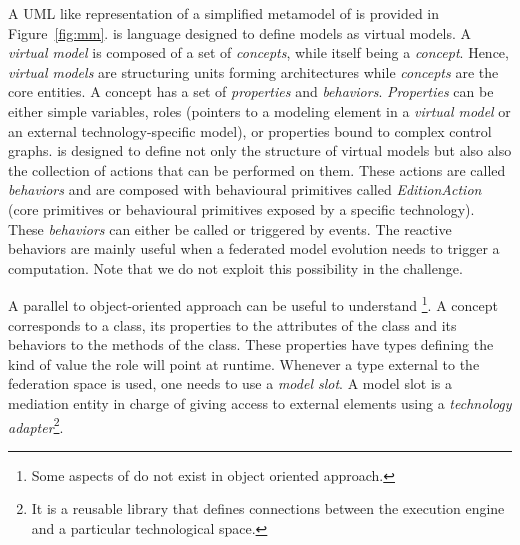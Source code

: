 A UML like representation of a simplified metamodel of \FML is provided in Figure~\ref{fig:mm}. \FML is language designed to define models as virtual models. A \emph{virtual model} is composed of a set of \emph{concepts}, while itself being a \emph{concept}. Hence, \emph{virtual models} are structuring units forming architectures while \emph{concepts} are the core entities. A concept has a set of \emph{properties} and \emph{behaviors}. \emph{Properties} can be either simple variables, roles (pointers to a modeling element in a \emph{virtual model} or an external technology-specific model), or properties bound to complex control graphs. \FML is designed to define not only the structure of virtual models but also also the collection of actions that can be performed on them. These actions are called \emph{behaviors} and are composed with behavioural primitives called \emph{EditionAction} (core \FML primitives or behavioural primitives exposed by a specific technology). These \emph{behaviors} can either be called or triggered by events. The reactive behaviors are mainly useful when a federated model evolution needs to trigger a computation. Note that we do not exploit this possibility in the challenge.

A parallel to object-oriented approach can be useful to understand \FML\footnote{Some aspects of \FML do not exist in object oriented approach.}. A concept corresponds to a class, its properties to the attributes of the class and its behaviors to the methods of the class. These properties have types defining the kind of value the role will point at runtime. Whenever a type external to the federation space is used, one needs to use a \emph{model slot}. A model slot is a mediation entity in charge of giving access to external elements using a \emph{technology adapter}\footnote{It is a reusable library that defines connections between the \FML execution engine and a particular technological space.}.



